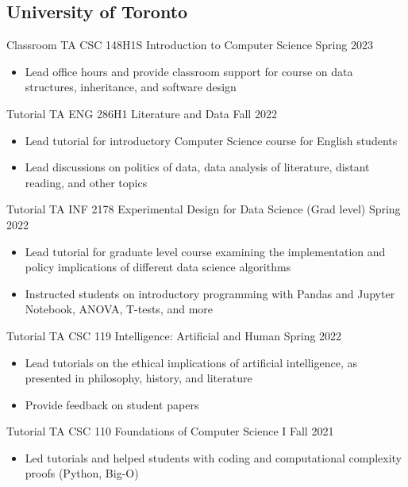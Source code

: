 \subsection{University of Toronto}
Classroom TA CSC 148H1S Introduction to Computer Science \hfill Spring 2023\\
\begin{itemize} 
\item Lead office hours and provide classroom support for course on data structures, inheritance, and software design
\end{itemize} 

Tutorial TA ENG 286H1 Literature and Data \hfill Fall 2022\\
\begin{itemize} 
\item Lead tutorial for introductory Computer Science course for English students
\item Lead discussions on politics of data, data analysis of literature, distant reading, and other topics
\end{itemize} 

Tutorial TA INF 2178 Experimental Design for Data Science (Grad level) \hfill Spring 2022\\
\begin{itemize} 
\item Lead tutorial for graduate level course examining the implementation and policy implications of different data science algorithms 
\item Instructed students on introductory programming with Pandas and Jupyter Notebook, ANOVA, T-tests, and more
\end{itemize} 

Tutorial TA CSC 119 Intelligence: Artificial and Human  \hfill Spring 2022\\
\begin{itemize} 
\item Lead tutorials on the ethical implications of artificial intelligence, as presented in philosophy, history, and literature
\item Provide feedback on student papers
\end{itemize} 
 
Tutorial TA CSC 110 Foundations of Computer Science I \hfill Fall 2021\\
\begin{itemize} 
\item Led tutorials and helped students with coding and computational complexity proofs (Python, Big-O)
\end{itemize} 